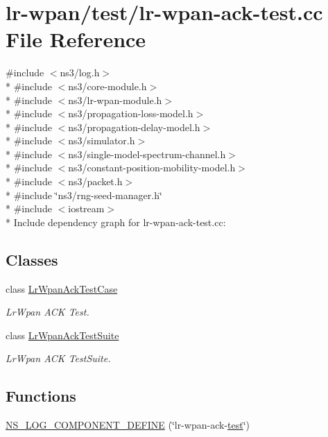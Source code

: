 \hypertarget{lr-wpan-ack-test_8cc}{}\section{lr-\/wpan/test/lr-\/wpan-\/ack-\/test.cc File Reference}
\label{lr-wpan-ack-test_8cc}
{\ttfamily \#include $<$ns3/log.\+h$>$}\\*
{\ttfamily \#include $<$ns3/core-\/module.\+h$>$}\\*
{\ttfamily \#include $<$ns3/lr-\/wpan-\/module.\+h$>$}\\*
{\ttfamily \#include $<$ns3/propagation-\/loss-\/model.\+h$>$}\\*
{\ttfamily \#include $<$ns3/propagation-\/delay-\/model.\+h$>$}\\*
{\ttfamily \#include $<$ns3/simulator.\+h$>$}\\*
{\ttfamily \#include $<$ns3/single-\/model-\/spectrum-\/channel.\+h$>$}\\*
{\ttfamily \#include $<$ns3/constant-\/position-\/mobility-\/model.\+h$>$}\\*
{\ttfamily \#include $<$ns3/packet.\+h$>$}\\*
{\ttfamily \#include \char`\"{}ns3/rng-\/seed-\/manager.\+h\char`\"{}}\\*
{\ttfamily \#include $<$iostream$>$}\\*
Include dependency graph for lr-\/wpan-\/ack-\/test.cc\+:
\subsection*{Classes}
\begin{DoxyCompactItemize}
\item 
class \hyperlink{classLrWpanAckTestCase}{Lr\+Wpan\+Ack\+Test\+Case}
\begin{DoxyCompactList}\small\item\em Lr\+Wpan A\+CK Test. \end{DoxyCompactList}\item 
class \hyperlink{classLrWpanAckTestSuite}{Lr\+Wpan\+Ack\+Test\+Suite}
\begin{DoxyCompactList}\small\item\em Lr\+Wpan A\+CK Test\+Suite. \end{DoxyCompactList}\end{DoxyCompactItemize}
\subsection*{Functions}
\begin{DoxyCompactItemize}
\item 
\hyperlink{lr-wpan-ack-test_8cc_af897617f5daa0520c5ec0e5f3bd1f4c7}{N\+S\+\_\+\+L\+O\+G\+\_\+\+C\+O\+M\+P\+O\+N\+E\+N\+T\+\_\+\+D\+E\+F\+I\+NE} (\char`\"{}lr-\/wpan-\/ack-\/\hyperlink{main-test-sync_8cc_a708a4c1a4d0c4acc4c447310dd4db27f}{test}\char`\"{})
\end{DoxyCompactItemize}
